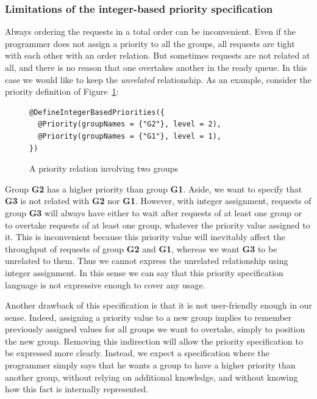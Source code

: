 \documentclass[11pt]{report}
\begin{document}
\subsubsection{Limitations of the integer-based priority specification}
Always ordering the requests in a total order can be inconvenient. Even if the programmer does not assign a priority to all the groups, all requests are tight with each other with an order relation. But sometimes requests are not related at all, and there is no reason that one overtakes another in the ready queue. In this case we would like to keep the \emph{unrelated} relationship. As an example, consider the priority definition of Figure~\ref{fig:two_priorities}:

\begin{figure}[!ht]
	\lstset{language=java, numbers=left, numberstyle=\tiny, stepnumber=1, numbersep=5pt, basicstyle=\footnotesize}
	\begin{lstlisting}[frame=single]
@DefineIntegerBasedPriorities({
  @Priority(groupNames = {"G2"}, level = 2),
  @Priority(groupNames = {"G1"}, level = 1),
})
 	\end{lstlisting}
\caption{A priority relation involving two groups}
\label{fig:two_priorities}
\end{figure}

Group \textbf{G2} has a higher priority than group \textbf{G1}. Aside, we want to specify that \textbf{G3} is not related with \textbf{G2} nor \textbf{G1}. However, with integer assignment, requests of group \textbf{G3} will always have either to wait after requests of at least one group or to overtake requests of at least one group, whatever the priority value assigned to it. This is inconvenient because this priority value will inevitably affect the throughput of requests of group \textbf{G2} and \textbf{G1}, whereas we want \textbf{G3} to be unrelated to them. Thus we cannot express the unrelated relationship using integer assignment.   
In this sense we can say that this priority specification language is not expressive enough to cover any usage. 

Another drawback of this specification is that it is not user-friendly enough in our sense. Indeed, assigning a priority value to a new group implies to remember previously assigned values for all groups we want to overtake, simply to position the new group. Removing this indirection will allow the priority specification to be expressed more clearly. Instead, we expect a specification where the programmer simply says that he wants a group to have a higher priority than another group, without relying on additional knowledge, and without knowing how this fact is internally represented.
\end{document}
